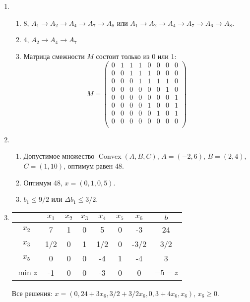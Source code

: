 \documentclass[12pt]{article}
\DeclareMathOperator{\Convex}{Convex}
\begin{document}
\begin{enumerate}
\begin{enumerate}
\end{enumerate}
  \item 
\begin{enumerate}
  \item 8, $A_1 \to A_2 \to A_4 \to A_7 \to A_8$ или $A_1 \to A_2 \to A_4 \to A_7 \to A_6 \to A_8$.
  \item 4, $A_2 \to A_4 \to A_7$
  \item Матрица смежности $M$ состоит только из 0 или 1:
  \[
    M = \begin{pmatrix}
      0 & 1 & 1 & 1 & 0 & 0 & 0 & 0 \\
      0 & 0 & 1 & 1 & 1 & 0 & 0 & 0 \\
      0 & 0 & 0 & 1 & 1 & 1 & 1 & 0 \\
      0 & 0 & 0 & 0 & 0 & 0 & 1 & 0 \\
      0 & 0 & 0 & 0 & 0 & 0 & 0 & 1 \\
      0 & 0 & 0 & 0 & 1 & 0 & 0 & 1 \\
      0 & 0 & 0 & 0 & 0 & 1 & 0 & 1 \\
      0 & 0 & 0 & 0 & 0 & 0 & 0 & 0 \\
    \end{pmatrix}
    \]   
\end{enumerate}
\item 
\begin{enumerate}
  \item Допустимое множество $\Convex(A, B, C)$, $A = (-2, 6)$, $B = (2, 4)$, $C = (1, 10)$, оптимум равен 48.
  \item Оптимум 48, $x = (0, 1, 0, 5)$.
  \item $b_1 \leq 9/2$ или $\Delta b_1 \leq 3/2$.
\end{enumerate}
\item 

\begin{tabular}{ccccccc|c}
  \toprule
    & $x_1$ & $x_2$ & $x_3$ & $x_4$ & $x_5$ & $x_6$ & $b$  \\ \midrule
$x_2$ & 7 & 1 & 0 & 5 & 0 & -3 & 24  \\
$x_3$ & 1/2 & 0 & 1 & 1/2 & 0 & -3/2 & 3/2  \\
$x_5$ & 0 & 0 & 0 & -4 & 1 & -4 & 3  \\ \midrule
$\min z$ & -1 & 0 & 0 & -3 & 0 & 0 & $-5 - z$  \\ \bottomrule
\end{tabular}

Все решения: $x = (0, 24 + 3x_6, 3/2 + 3/2x_6, 0, 3 + 4x_6, x_6)$, $x_6 \geq 0$. 


\end{enumerate}
\end{document}
